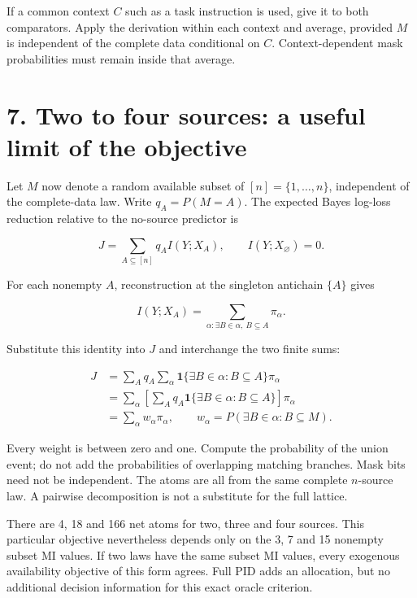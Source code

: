 \documentclass[11pt,a4paper]{article}
\newcounter{none}
\begin{document}
If a common context \(C\) such as a task instruction is used, give it to both comparators. Apply the derivation within each context and average, provided \(M\) is independent of the complete data conditional on \(C\). Context-dependent mask probabilities must remain inside that average.

\par{}

\section{7. Two to four sources: a useful limit of the objective}\label{two-to-four-sources-a-useful-limit-of-the-objective}

Let \(M\) now denote a random available subset of \([n]=\{1,\ldots,n\}\), independent of the complete-data law. Write \(q_A=P(M=A)\). The expected Bayes log-loss reduction relative to the no-source predictor is

\[
J=\sum_{A\subseteq[n]}q_A I(Y;X_A),\qquad I(Y;X_\varnothing)=0.
\]

For each nonempty \(A\), reconstruction at the singleton antichain \(\{A\}\) gives

\[
I(Y;X_A)=\sum_{\alpha:\exists B\in\alpha,\ B\subseteq A}\pi_\alpha.
\]

Substitute this identity into \(J\) and interchange the two finite sums:

\[
\begin{aligned}
J&=\sum_Aq_A\sum_\alpha
\mathbf1\{\exists B\in\alpha:B\subseteq A\}\pi_\alpha\\
&=\sum_\alpha\left[\sum_Aq_A
\mathbf1\{\exists B\in\alpha:B\subseteq A\}\right]\pi_\alpha\\
&=\boxed{\sum_\alpha w_\alpha\pi_\alpha},\qquad
w_\alpha=P(\exists B\in\alpha:B\subseteq M).
\end{aligned}
\]

Every weight is between zero and one. Compute the probability of the union event; do not add the probabilities of overlapping matching branches. Mask bits need not be independent. The atoms are all from the same complete \(n\)-source law. A pairwise decomposition is not a substitute for the full lattice.

There are 4, 18 and 166 net atoms for two, three and four sources. This particular objective nevertheless depends only on the 3, 7 and 15 nonempty subset MI values. If two laws have the same subset MI values, every exogenous availability objective of this form agrees. Full PID adds an allocation, but no additional decision information for this exact oracle criterion.
\end{document}
